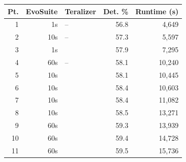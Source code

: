   \begin{tabular}{rrlrr}
  \toprule
  Pt. & EvoSuite & Teralizer & Det. \% & Runtime (s) \\
  \midrule
  1 & 1s & -- & 56.8 & 4,649 \\
  2 & 10s & -- & 57.3 & 5,597 \\
  3 & 1s & \VariantImprovedA{} & 57.9 & 7,295 \\
  4 & 60s & -- & 58.1 & 10,240 \\
  5 & 10s & \VariantNaiveA{} & 58.1 & 10,445 \\
  6 & 10s & \VariantImprovedB{} & 58.4 & 10,603 \\
  7 & 10s & \VariantImprovedA{} & 58.4 & 11,082 \\
  8 & 10s & \VariantImprovedC{} & 58.5 & 13,271 \\
  9 & 60s & \VariantImprovedA{} & 59.3 & 13,939 \\
  10 & 60s & \VariantImprovedB{} & 59.4 & 14,728 \\
  11 & 60s & \VariantImprovedC{} & 59.5 & 15,736 \\
  \bottomrule
  \end{tabular}
